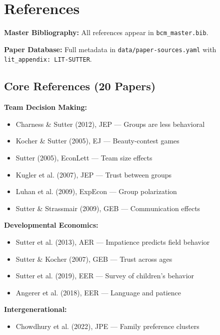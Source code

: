 \section{References}
\label{sec:su-references}

\begin{tcolorbox}[colback=blue!5!white, colframe=blue!75!black]
\textbf{Master Bibliography:} All references appear in \texttt{bcm\_master.bib}.

\textbf{Paper Database:} Full metadata in \texttt{data/paper-sources.yaml} with \texttt{lit\_appendix: LIT-SUTTER}.
\end{tcolorbox}

\subsection{Core References (20 Papers)}

\textbf{Team Decision Making:}
\begin{itemize}[nosep]
\item Charness \& Sutter (2012), JEP --- Groups are less behavioral
\item Kocher \& Sutter (2005), EJ --- Beauty-contest games
\item Sutter (2005), EconLett --- Team size effects
\item Kugler et al. (2007), JEP --- Trust between groups
\item Luhan et al. (2009), ExpEcon --- Group polarization
\item Sutter \& Strassmair (2009), GEB --- Communication effects
\end{itemize}

\textbf{Developmental Economics:}
\begin{itemize}[nosep]
\item Sutter et al. (2013), AER --- Impatience predicts field behavior
\item Sutter \& Kocher (2007), GEB --- Trust across ages
\item Sutter et al. (2019), EER --- Survey of children's behavior
\item Angerer et al. (2018), EER --- Language and patience
\end{itemize}

\textbf{Intergenerational:}
\begin{itemize}[nosep]
\item Chowdhury et al. (2022), JPE --- Family preference clusters
\end{itemize}

